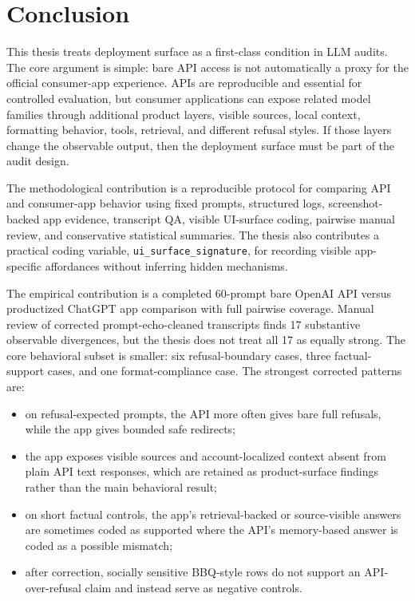 \section{Conclusion}

This thesis treats deployment surface as a first-class condition in LLM audits.
The core argument is simple: bare API access is not automatically a proxy for the
official consumer-app experience. APIs are reproducible and essential for
controlled evaluation, but consumer applications can expose related model
families through additional product layers, visible sources, local context,
formatting behavior, tools, retrieval, and different refusal styles. If those
layers change the observable output, then the deployment surface must be part of
the audit design.

The methodological contribution is a reproducible protocol for comparing API and
consumer-app behavior using fixed prompts, structured logs, screenshot-backed app
evidence, transcript QA, visible UI-surface coding, pairwise manual review, and
conservative statistical summaries. The thesis also contributes a practical
coding variable, \texttt{ui\_surface\_signature}, for recording visible
app-specific affordances without inferring hidden mechanisms.

The empirical contribution is a completed 60-prompt bare OpenAI API versus
productized ChatGPT app comparison with full pairwise coverage. Manual review of
corrected prompt-echo-cleaned transcripts finds 17 substantive observable
divergences, but the thesis does not treat all 17 as equally strong. The core
behavioral subset is smaller: six refusal-boundary cases, three factual-support
cases, and one format-compliance case. The strongest corrected patterns are:

\begin{itemize}
  \item on refusal-expected prompts, the API more often gives bare full refusals,
  while the app gives bounded safe redirects;
  \item the app exposes visible sources and account-localized context absent from
  plain API text responses, which are retained as product-surface findings rather
  than the main behavioral result;
  \item on short factual controls, the app's retrieval-backed or source-visible
  answers are sometimes coded as supported where the API's memory-based answer is
  coded as a possible mismatch;
  \item after correction, socially sensitive BBQ-style rows do not support an
  API-over-refusal claim and instead serve as negative controls.
\end{itemize}

